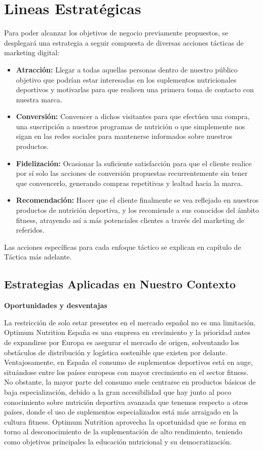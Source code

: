 \documentclass[11pt,a4paper]{report}
\begin{document}
\newpage
\section{Lineas Estratégicas}
Para poder alcanzar los objetivos de negocio previamente propuestos, se desplegará una estrategia a seguir compuesta de diversas acciones tácticas de marketing digital:

\begin{itemize}
    \item \textbf{Atracción:} Llegar a todas aquellas personas dentro de nuestro público objetivo que podrían estar interesadas en los suplementos nutricionales deportivos y motivarlas para que realicen una primera toma de contacto con nuestra marca.
    
    \item \textbf{Conversión:} Convencer a dichos visitantes para que efectúen una compra, una suscripción a nuestros programas de nutrición o que simplemente nos sigan en las redes sociales para mantenerse informados sobre nuestros productos.
    
    \item \textbf{Fidelización:} Ocasionar la suficiente satisfacción para que el cliente realice por sí solo las acciones de conversión propuestas recurrentemente sin tener que convencerlo, generando compras repetitivas y lealtad hacia la marca.
    
    \item \textbf{Recomendación:} Hacer que el cliente finalmente se vea reflejado en nuestros productos de nutrición deportiva, y los recomiende a sus conocidos del ámbito fitness, atrayendo así a más potenciales clientes a través del marketing de referidos.
\end{itemize}

Las acciones específicas para cada enfoque táctico se explican en capítulo de Táctica más adelante.
\subsection{Estrategias Aplicadas en Nuestro Contexto}
\textbf{Oportunidades y desventajas}

La restricción de solo estar presentes en el mercado español no es una limitación. Optimum Nutrition España es una empresa en crecimiento y la prioridad antes de expandirse por Europa es asegurar el mercado de origen, solventando los obstáculos de distribución y logística sostenible que existen por delante. Ventajosamente, en España el consumo de suplementos deportivos está en auge, situándose entre los países europeos con mayor crecimiento en el sector fitness. No obstante, la mayor parte del consumo suele centrarse en productos básicos de baja especialización, debido a la gran accesibilidad que hay junto al poco conocimiento sobre nutrición deportiva avanzada que tenemos respecto a otros países, donde el uso de suplementos especializados está más arraigado en la cultura fitness. Optimum Nutrition aprovecha la oportunidad que se forma en torno al desconocimiento de la suplementación de alto rendimiento, teniendo como objetivos principales la educación nutricional y su democratización.
\end{document}
